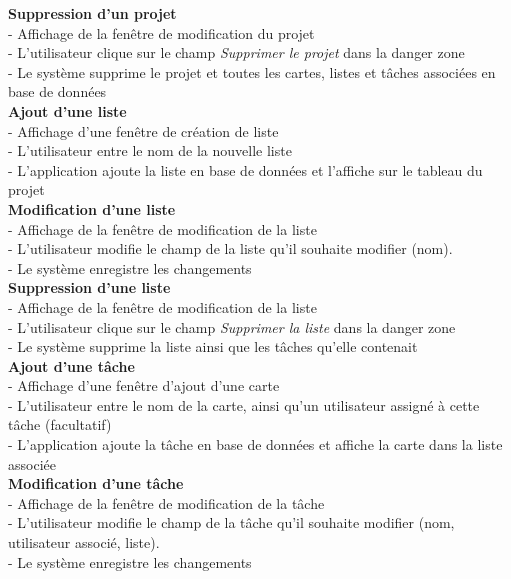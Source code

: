 \documentclass[conference]{IEEEtran}
\begin{document}
\textbf{Suppression d'un projet}\\
- Affichage de la fenêtre de modification du projet\\
- L'utilisateur clique sur le champ \textit{Supprimer le projet} dans la danger zone\\
- Le système supprime le projet et toutes les cartes, listes et tâches associées en base de données\\

\textbf{Ajout d'une liste}\\
- Affichage d'une fenêtre de création de liste\\
- L'utilisateur entre le nom de la nouvelle liste\\
- L'application ajoute la liste en base de données et l'affiche sur le tableau du projet\\

\textbf{Modification d'une liste}\\
- Affichage de la fenêtre de modification de la liste\\
- L'utilisateur modifie le champ de la liste qu'il souhaite modifier (nom).\\
- Le système enregistre les changements\\

\textbf{Suppression d'une liste}\\
- Affichage de la fenêtre de modification de la liste\\
- L'utilisateur clique sur le champ \textit{Supprimer la liste} dans la danger zone\\
- Le système supprime la liste ainsi que les tâches qu'elle contenait\\

\textbf{Ajout d'une tâche}\\
- Affichage d'une fenêtre d'ajout d'une carte\\
- L'utilisateur entre le nom de la carte, ainsi qu'un utilisateur assigné à cette tâche (facultatif)\\
- L'application ajoute la tâche en base de données et affiche la carte dans la liste associée\\

\textbf{Modification d'une tâche}\\
- Affichage de la fenêtre de modification de la tâche\\
- L'utilisateur modifie le champ de la tâche qu'il souhaite modifier (nom, utilisateur associé, liste).\\
- Le système enregistre les changements\\
\end{document}
